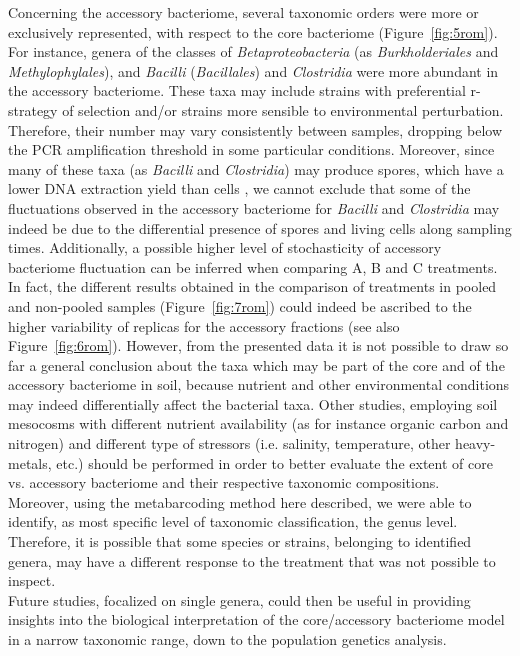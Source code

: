 Concerning the accessory bacteriome, several taxonomic orders were more or exclusively represented, with respect to the core bacteriome (Figure~\ref{fig:5rom}). For instance, genera of the classes of \textit{Betaproteobacteria} (as \textit{Burkholderiales} and \textit{Methylophylales}), and \textit{Bacilli} (\textit{Bacillales}) and \textit{Clostridia} were more abundant in the accessory bacteriome. These taxa may include strains with preferential r-strategy of selection and/or strains more sensible to environmental perturbation. Therefore, their number may vary consistently between samples, dropping below the PCR amplification threshold in some particular conditions. Moreover, since many of these taxa (as \textit{Bacilli} and \textit{Clostridia}) may produce spores, which have a lower DNA extraction yield than cells \cite{dineen2010evaluation}, we cannot exclude that some of the fluctuations observed in the accessory bacteriome for \textit{Bacilli} and \textit{Clostridia} may indeed be due to the differential presence of spores and living cells along sampling times. Additionally, a possible higher level of stochasticity of accessory bacteriome fluctuation can be inferred when comparing A, B and C treatments. In fact, the different results obtained in the comparison of treatments in pooled and non-pooled samples (Figure~\ref{fig:7rom}) could indeed be ascribed to the higher variability of replicas for the accessory fractions (see also Figure~\ref{fig:6rom}). However, from the presented data it is not possible to draw so far a general conclusion about the taxa which may be part of the core and of the accessory bacteriome in soil, because nutrient and other environmental conditions may indeed differentially affect the bacterial taxa. Other studies, employing soil mesocosms with different nutrient availability (as for instance organic carbon and nitrogen) and different type of  stressors (i.e. salinity, temperature, other heavy-metals, etc.) should be performed in order to better evaluate the extent of core vs. accessory bacteriome and their respective taxonomic compositions.\\
Moreover, using the metabarcoding method here described, we were able to identify, as most specific level of taxonomic classification, the genus level. Therefore, it is possible that some species or strains, belonging to identified genera, may have a different response to the treatment that was not possible to inspect.\\
Future studies, focalized on single genera, could then be useful in providing insights into the biological interpretation of the core/accessory bacteriome model in a narrow taxonomic range, down to the population genetics analysis.\\
